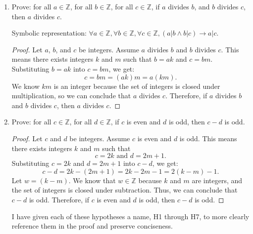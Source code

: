 \documentclass{article}
\newcommand\Z{\mathbb{Z}}
\begin{document}
\begin{enumerate}
\begin{proof}
          \end{proof}

          \newpage

    \item Prove: for all $a \in \mathbb{Z}$, for all $b \in \mathbb{Z}$, for all $c \in
              \mathbb{Z}$, if $a$ divides $b$, and $b$ divides $c$, then $a$ divides $c$.

          Symbolic representation: $\forall a \in \Z, \forall b \in \Z, \forall c \in \Z,
              (a|b \land b|c) \rightarrow a|c$.

          \begin{proof}
              Let $a$, $b$, and $c$ be integers. Assume $a$ divides $b$ and $b$ divides $c$. This means there exists integers $k$ and $m$ such that $b = ak$ and $c = bm$.
              Substituting $b = ak$ into $c = bm$, we get:
              \[
                  c = bm = (ak)m = a(km).
              \]
              We know $km$ is an integer because the set of integers is closed under
              multiplication, so we can conclude that $a$ divides $c$. Therefore, if $a$
              divides $b$ and $b$ divides $c$, then $a$ divides $c$.
          \end{proof}

          \newpage

    \item Prove: for all $c \in \mathbb{Z}$, for all $d \in \mathbb{Z}$, if $c$ is even
          and $d$ is odd, then $c-d$ is odd.
          \begin{proof}
              Let $c$ and $d$ be integers. Assume $c$ is even and $d$ is odd. This means there exists integers $k$ and $m$ such that
              \[
                  c = 2k \text{ and } d = 2m + 1.
              \]
              Substituting $c = 2k$ and $d = 2m + 1$ into $c - d$, we get:
              \[
                  c - d = 2k - (2m + 1) = 2k - 2m - 1 = 2(k - m) - 1.
              \]
              Let $w = (k - m).$ We know that $w \in \mathbb{Z}$ because $k$ and $m$ are
              integers, and the set of integers is closed under subtraction. Thus, we can
              conclude that $c - d$ is odd. Therefore, if $c$ is even and $d$ is odd, then $c
                  - d$ is odd.
          \end{proof}

          \newpage

          I have given each of these hypotheses a name, H1 through H7, to more clearly
          reference them in the proof and preserve conciseness.


\end{enumerate}
\end{document}
